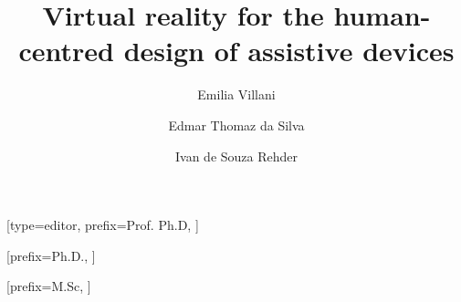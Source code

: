 

\title [mode = title]{Virtual reality for the human-centred design of assistive devices}





%
\author[1]{Emilia Villani}[type=editor,
                        prefix=Prof. Ph.D,
                        ]

\cormark[1]




\author[1]{Edmar Thomaz da Silva}[prefix=Ph.D.,
                        ]

\author[1]{Ivan de Souza Rehder}[prefix=M.Sc,
                        ]




